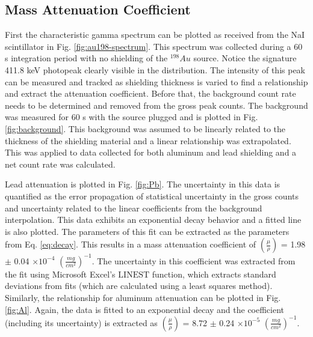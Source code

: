 \subsection{Mass Attenuation Coefficient}

First the characteristic gamma spectrum can be plotted as received from the NaI scintillator in Fig. \ref{fig:au198-spectrum}. This spectrum was collected during a 60 s integration period with no shielding of the ${}^{198}Au$ source. Notice the signature 411.8 keV photopeak clearly visible in the distribution. The intensity of this peak can be measured and tracked as shielding thickness is varied to find a relationship and extract the attenuation coefficient. Before that, the background count rate needs to be determined and removed from the gross peak counts. The background was measured for 60 s with the source plugged and is plotted in Fig. \ref{fig:background}. This background was assumed to be linearly related to the thickness of the shielding material and a linear relationship was extrapolated. This was applied to data collected for both aluminum and lead shielding and a net count rate was calculated.

Lead attenuation is plotted in Fig. \ref{fig:Pb}. The uncertainty in this data is quantified as the error propagation of statistical uncertainty in the gross counts and uncertainty related to the linear coefficients from the background interpolation. This data exhibits an exponential decay behavior and a fitted line is also plotted. The parameters of this fit can be extracted as the parameters from Eq. \ref{eq:decay}. This results in a mass attenuation coefficient of $(\frac{\mu}{\rho})$ = 1.98 $\pm$ 0.04 $\times 10^{-4}$ $(\frac{mg}{cm^2})^{-1}$. The uncertainty in this coefficient was extracted from the fit using Microsoft Excel’s $\mathrm{LINEST}$ function, which extracts standard deviations from fits (which are calculated using a least squares method). Similarly, the relationship for aluminum attenuation can be plotted in Fig. \ref{fig:Al}. Again, the data is fitted to an exponential decay and the coefficient (including its uncertainty) is extracted as $(\frac{\mu}{\rho})$ = 8.72 $\pm$ 0.24 $\times 10^{-5}$ $(\frac{mg}{cm^2})^{-1}$.
